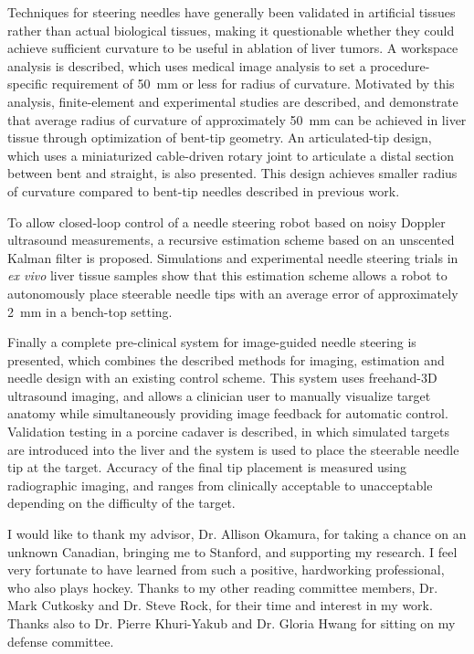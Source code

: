 \documentclass[12pt,twoside]{report}
\begin{document}
Techniques for steering needles have generally been validated in artificial tissues rather than actual biological tissues, making it questionable whether they could achieve sufficient curvature to be useful in ablation of liver tumors. A workspace analysis is described, which uses medical image analysis to set a procedure-specific requirement of 50~mm or less for radius of curvature. Motivated by this analysis, finite-element and experimental studies are described, and demonstrate that average radius of curvature of approximately 50~mm can be achieved in liver tissue through optimization of bent-tip geometry. An articulated-tip design, which uses a miniaturized cable-driven rotary joint to articulate a distal section between bent and straight, is also presented. This design achieves smaller radius of curvature compared to bent-tip needles described in previous work.

To allow closed-loop control of a needle steering robot based on noisy Doppler ultrasound measurements, a recursive estimation scheme based on an unscented Kalman filter is proposed. Simulations and experimental needle steering trials in \textit{ex vivo} liver tissue samples show that this estimation scheme allows a robot to autonomously place steerable needle tips with an average error of approximately 2~mm in a bench-top setting.

Finally a complete pre-clinical system for image-guided needle steering is presented, which combines the described methods for imaging, estimation and needle design with an existing control scheme. This system uses freehand-3D ultrasound imaging, and allows a clinician user to manually visualize target anatomy while simultaneously providing image feedback for automatic control. Validation testing in a porcine cadaver is described, in which simulated targets are introduced into the liver and the system is used to place the steerable needle tip at the target. Accuracy of the final tip placement is measured using radiographic imaging, and ranges from clinically acceptable to unacceptable depending on the difficulty of the target. 


I would like to thank my advisor, Dr. Allison Okamura, for taking a chance on an unknown Canadian, bringing me to Stanford, and supporting my research. I feel very fortunate to have learned from such a positive, hardworking professional, who also plays hockey. Thanks to my other reading committee members, Dr. Mark Cutkosky and Dr. Steve Rock, for their time and interest in my work. Thanks also to Dr. Pierre Khuri-Yakub and Dr. Gloria Hwang for sitting on my defense committee. 
\end{document}
